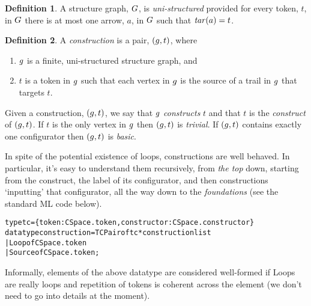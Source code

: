 \documentclass[a4paper]{article}
\theoremstyle{definition}
\newtheorem{definition}{Definition}
\begin{document}
		\begin{definition}\label{defn:uniStructured}
			A structure graph, $G$, is \textit{uni-structured} provided for every token, $t$, in $G$ there is at most one arrow, $a$, in $G$ such that $\mathit{tar}(a)= t$.
		\end{definition}


		\begin{definition}\label{defn:construction}
			A \textit{construction} is a pair, $(g,t)$, where
			\begin{enumerate}[itemsep=0pt,topsep=4pt]
				\item  $g$ is a finite, uni-structured structure graph, and
				\item $t$ is a token in $g$ such that each vertex in $g$ is the source of a trail in $g$ that targets $t$.
			\end{enumerate}
			Given a construction, $(g,t)$, we say that $g$ \textit{constructs} $t$ and that $t$ is the \textit{construct} of $(g,t)$. If $t$ is the only vertex in $g$ then $(g,t)$ is \textit{trivial}. If $(g,t)$ contains exactly one configurator then $(g,t)$ is \textit{basic}.
		\end{definition}


		In spite of the potential existence of loops, constructions are well behaved. In particular, it's easy to understand them recursively, from \textit{the top} down, starting from the construct, the label of its configurator, and then constructions `inputting' that configurator, all the way down to the \textit{foundations} (see the standard ML code below).
\begin{alltt}
type tc = \{token : CSpace.token, constructor : CSpace.constructor\}
datatype construction = TCPair of tc * construction list
                      | Loop of CSpace.token
                      | Source of CSpace.token ;
\end{alltt}
		Informally, elements of the above datatype are considered well-formed if Loops are really loops and repetition of tokens is coherent across the element (we don't need to go into details at the moment).
\end{document}
